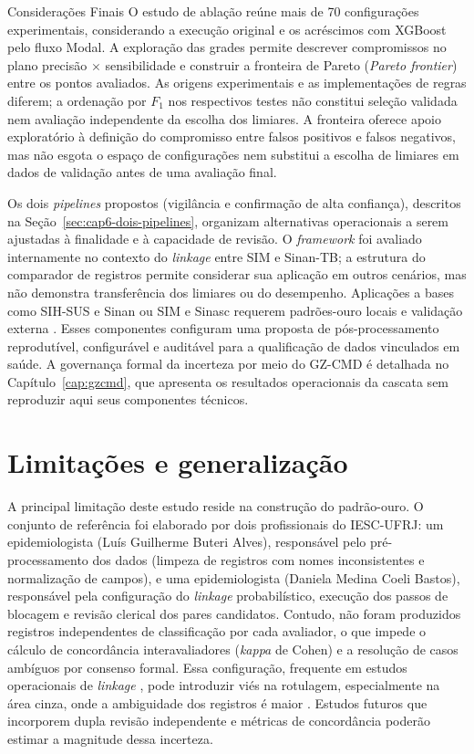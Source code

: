 \begin{chapter}{Considerações Finais}
O estudo de ablação reúne mais de 70 configurações experimentais, considerando a execução original e os acréscimos com XGBoost pelo fluxo Modal. A exploração das grades permite descrever compromissos no plano precisão $\times$ sensibilidade e construir a fronteira de Pareto (\textit{Pareto frontier}) entre os pontos avaliados. As origens experimentais e as implementações de regras diferem; a ordenação por $F_1$ nos respectivos testes não constitui seleção validada nem avaliação independente da escolha dos limiares. A fronteira oferece apoio exploratório à definição do compromisso entre falsos positivos e falsos negativos, mas não esgota o espaço de configurações nem substitui a escolha de limiares em dados de validação antes de uma avaliação final.

Os dois \textit{pipelines} propostos (vigilância e confirmação de alta confiança), descritos na Seção~\ref{sec:cap6-dois-pipelines}, organizam alternativas operacionais a serem ajustadas à finalidade e à capacidade de revisão. O \textit{framework} foi avaliado internamente no contexto do \textit{linkage} entre SIM e Sinan-TB; a estrutura do comparador de registros \cite{Jardim2024comparador} permite considerar sua aplicação em outros cenários, mas não demonstra transferência dos limiares ou do desempenho. Aplicações a bases como SIH-SUS e Sinan ou SIM e Sinasc requerem padrões-ouro locais e validação externa \cite{Christen2012book, Paixao2017linkageevaluation}. Esses componentes configuram uma proposta de pós-processamento reprodutível, configurável e auditável para a qualificação de dados vinculados em saúde. A governança formal da incerteza por meio do GZ-CMD é detalhada no Capítulo~\ref{cap:gzcmd}, que apresenta os resultados operacionais da cascata sem reproduzir aqui seus componentes técnicos.

\section{Limitações e generalização}
\label{sec:cap6-limitacoes}

A principal limitação deste estudo reside na construção do padrão-ouro. O conjunto de referência foi elaborado por dois profissionais do IESC-UFRJ: um epidemiologista (Luís Guilherme Buteri Alves), responsável pelo pré-processamento dos dados (limpeza de registros com nomes inconsistentes e normalização de campos), e uma epidemiologista (Daniela Medina Coeli Bastos), responsável pela configuração do \textit{linkage} probabilístico, execução dos passos de blocagem e revisão clerical dos pares candidatos. Contudo, não foram produzidos registros independentes de classificação por cada avaliador, o que impede o cálculo de concordância interavaliadores (\textit{kappa} de Cohen) e a resolução de casos ambíguos por consenso formal. Essa configuração, frequente em estudos operacionais de \textit{linkage} \cite{Gupta2022framework, Gupta2024manual}, pode introduzir viés na rotulagem, especialmente na área cinza, onde a ambiguidade dos registros é maior \cite{Harron2017linkagequality}. Estudos futuros que incorporem dupla revisão independente e métricas de concordância poderão estimar a magnitude dessa incerteza.


\end{chapter}
